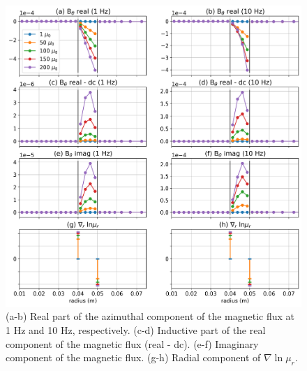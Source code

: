 \begin{figure}
    \begin{center}
    \includegraphics[width=\textwidth]{figures/magnetization-term-freq.png}
    \end{center}
\caption{
    (a-b) Real part of the azimuthal component of the magnetic flux at 1 Hz and 10 Hz, respectively.
    (c-d) Inductive part of the real component of the magnetic flux (real - dc).
    (e-f) Imaginary component of the magnetic flux.
    (g-h) Radial component of $\nabla \ln \mu_r$.
}
\label{fig:magnetization-term-freq}
\end{figure}



